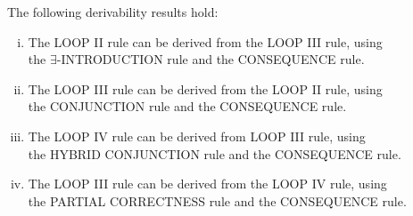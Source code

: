 \documentclass[manuscript, screen, review]{acmart}
\begin{document}
\begin{lemma}[Derivability] \label{lem:derivability}
The following derivability results hold:

\begin{enumerate} [(i)]
   \item The {\rm LOOP II} rule can be derived from the {\rm LOOP III} rule, using \\
   the  $\exists$-{\rm INTRODUCTION} rule and the {\rm CONSEQUENCE} rule.
   
    \vspace{2mm}

   \item The {\rm LOOP III} rule can be derived from the {\rm LOOP II} rule, using \\
   the {\rm CONJUNCTION} rule and the {\rm CONSEQUENCE} rule.
   
    \vspace{2mm}

   \item The {\rm LOOP IV} rule can be derived from {\rm LOOP III} rule, using \\
   the  {\rm HYBRID CONJUNCTION} rule and the {\rm CONSEQUENCE} rule.
   
    \vspace{2mm}

   \item The {\rm LOOP III} rule can be derived from the {\rm LOOP IV} rule, using \\
   the {\rm PARTIAL CORRECTNESS} rule and the {\rm CONSEQUENCE} rule.
   

   

   
\end{enumerate}

\end{lemma}
\end{document}
